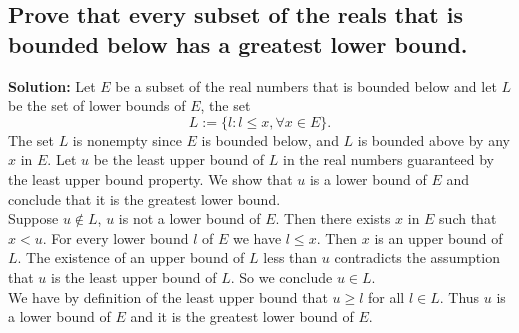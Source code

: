 \documentclass{article}
\newcommand{\exercise}[1]{\subsection{\normalfont #1}}
\newcommand{\solution}{\indent\indent \textbf{Solution: }}
\begin{document}
\exercise{Prove that every subset of the reals that is bounded below has a greatest lower bound.}
\solution
Let $E$ be a subset of the real numbers that is bounded below and let $L$ be the set of lower bounds of $E$, the set 
$$L := \{l : l \leq x, \forall x \in E\}.$$
The set $L$ is nonempty since $E$ is bounded below, and $L$ is bounded above by any $x$ in $E$. Let $u$ be the least upper bound of $L$ in the real numbers guaranteed by the least upper bound property. We show that $u$ is a lower bound of $E$ and conclude that it is the greatest lower bound. \\
\indent Suppose $u\notin L$, $u$ is not a lower bound of $E$. Then there exists $x$ in $E$ such that $x < u$. For every lower bound $l$ of $E$ we have $l\leq x$. Then $x$ is an upper bound of $L$. The existence of an upper bound of $L$ less than $u$ contradicts the assumption that $u$ is the least upper bound of $L$. So we conclude $u \in L$.\\
\indent We have by definition of the least upper bound that $u\geq l$ for all $l\in L$. Thus $u$ is a lower bound of $E$ and it is the greatest lower bound of $E$. 
\end{document}
